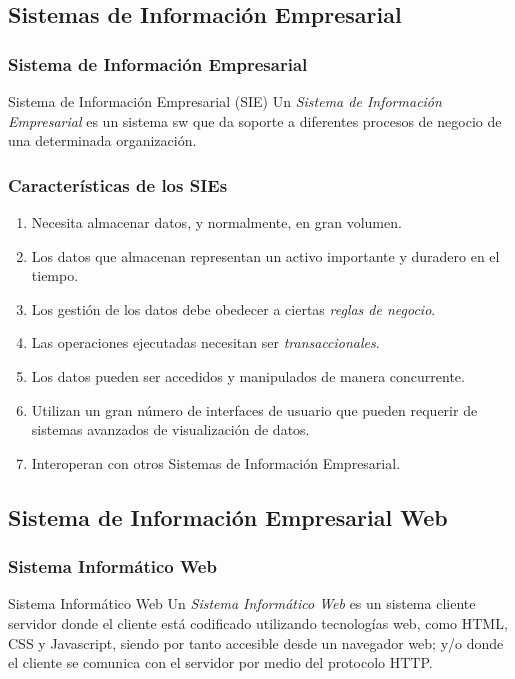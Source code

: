 \documentclass[a4paper,slidestop,xcolor=pst,dvips,blue]{beamer}
\begin{document}
\subsection{Sistemas de Información Empresarial}

\begin{frame}[c]
    \frametitle{Sistema de Información Empresarial}
    \begin{block}{Sistema de Información  Empresarial (SIE)}
        Un \emph{Sistema de Información Empresarial} es un sistema sw que da soporte a diferentes procesos de negocio de una determinada organización.
    \end{block}
\end{frame}

\begin{frame}[c]
    \frametitle{Características de los SIEs}
    \begin{enumerate}[<+->]
        \item Necesita almacenar datos, y normalmente, en gran volumen.
        \item Los datos que almacenan representan un activo importante y duradero en el tiempo.
        \item Los gestión de los datos debe obedecer a ciertas \emph{reglas de negocio}.
        \item Las operaciones ejecutadas necesitan ser \emph{transaccionales}.
        \item Los datos pueden ser accedidos y manipulados de manera concurrente.
        \item Utilizan un gran número de interfaces de usuario que pueden requerir de sistemas avanzados de visualización de datos.
        \item Interoperan con otros Sistemas de Información Empresarial.
    \end{enumerate}
\end{frame}

\subsection{Sistema de Información Empresarial Web}

\begin{frame}[c]
    \frametitle{Sistema Informático Web}
    \begin{block}{Sistema Informático Web}
        Un \emph{Sistema Informático Web} es un sistema cliente servidor donde el cliente está codificado utilizando tecnologías web, como HTML, CSS y Javascript, siendo por tanto accesible desde un navegador web; y/o donde el cliente se comunica con el servidor por medio del protocolo HTTP.
    \end{block}
\end{frame}
\end{document}
